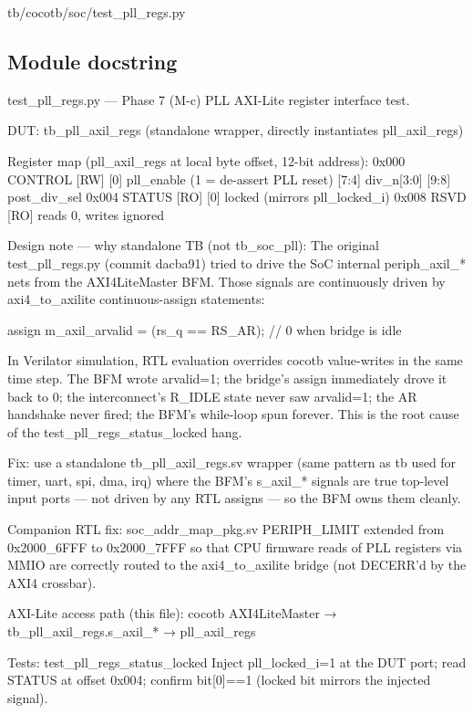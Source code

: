 \begin{relocated}{tb/cocotb/soc/test_pll_regs.py}

\subsection*{Module docstring}

\begin{textblock}
test_pll_regs.py — Phase 7 (M-c) PLL AXI-Lite register interface test.

DUT: tb_pll_axil_regs (standalone wrapper, directly instantiates pll_axil_regs)

Register map (pll_axil_regs at local byte offset, 12-bit address):
0x000  CONTROL [RW]
[0]    pll_enable   (1 = de-assert PLL reset)
[7:4]  div_n[3:0]
[9:8]  post_div_sel
0x004  STATUS  [RO]
[0]    locked       (mirrors pll_locked_i)
0x008  RSVD    [RO]          reads 0, writes ignored

Design note — why standalone TB (not tb_soc_pll):
The original test_pll_regs.py (commit dacba91) tried to drive the SoC
internal periph_axil_* nets from the AXI4LiteMaster BFM.  Those signals are
continuously driven by axi4_to_axilite continuous-assign statements:

assign m_axil_arvalid = (rs_q == RS_AR);   // 0 when bridge is idle

In Verilator simulation, RTL evaluation overrides cocotb value-writes in the
same time step.  The BFM wrote arvalid=1; the bridge's assign immediately
drove it back to 0; the interconnect's R_IDLE state never saw arvalid=1; the
AR handshake never fired; the BFM's while-loop spun forever.  This is the
root cause of the test_pll_regs_status_locked hang.

Fix: use a standalone tb_pll_axil_regs.sv wrapper (same pattern as tb used
for timer, uart, spi, dma, irq) where the BFM's s_axil_* signals are true
top-level input ports — not driven by any RTL assigns — so the BFM owns them
cleanly.

Companion RTL fix: soc_addr_map_pkg.sv PERIPH_LIMIT extended from
0x2000_6FFF to 0x2000_7FFF so that CPU firmware reads of PLL registers via
MMIO are correctly routed to the axi4_to_axilite bridge (not DECERR'd by the
AXI4 crossbar).

AXI-Lite access path (this file):
cocotb AXI4LiteMaster → tb_pll_axil_regs.s_axil_* → pll_axil_regs

Tests:
test_pll_regs_status_locked
Inject pll_locked_i=1 at the DUT port; read STATUS at offset 0x004;
confirm bit[0]==1 (locked bit mirrors the injected signal).


\end{textblock}
\end{relocated}

